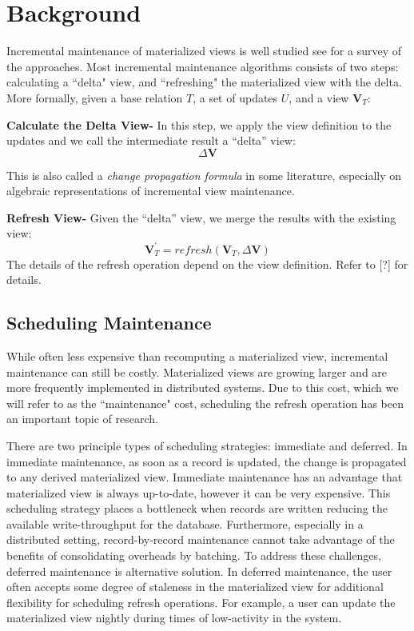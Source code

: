 \section{Background}
Incremental maintenance of materialized views is well studied see \cite{chirkova2011materialized} for a survey of the approaches. 
Most incremental maintenance algorithms consists of two steps: calculating a ``delta" view,
and ``refreshing" the materialized view with the delta.
More formally, given a base relation $T$, a set of updates $U$,
and a view $\textbf{V}_{T}$:

\textbf{Calculate the Delta View- }
In this step, we apply the view definition to the updates and we call
the intermediate result a ``delta'' view:
\[
\Delta\textbf{V}
\]

This is also called a \emph{change propagation formula} in some literature,
especially on algebraic representations of incremental view maintenance.

\textbf{Refresh View- }
Given the ``delta'' view, we merge the results with the existing
view:
\[
\textbf{V}_{T}^{'}=refresh(\textbf{V}_{T},\Delta\textbf{V})
\] 
The details of the refresh operation depend on the view definition.
Refer to [?] for details.


\subsection{Scheduling Maintenance}
While often less expensive than recomputing a materialized view,
incremental maintenance can still be costly.
Materialized views are growing larger and are more frequently 
implemented in distributed systems.
Due to this cost, which we will refer to as the ``maintenance" cost, 
scheduling the refresh operation has been an important topic of research.

There are two principle types of scheduling strategies: immediate and deferred. 
In immediate maintenance, as soon as a record is updated, 
the change is propagated to any derived materialized view.
Immediate maintenance has an advantage that materialized view is always up-to-date, 
however it can be very expensive.
This scheduling strategy places a bottleneck when records are written reducing 
the available write-throughput for the database.
Furthermore, especially in a distributed setting, record-by-record 
maintenance cannot take advantage of the benefits of consolidating overheads by batching.
To address these challenges, deferred maintenance is alternative solution.
In deferred maintenance, the user often accepts some degree of staleness in 
the materialized view for additional flexibility for scheduling refresh operations.
For example, a user can update the materialized view 
nightly during times of low-activity in the system.

